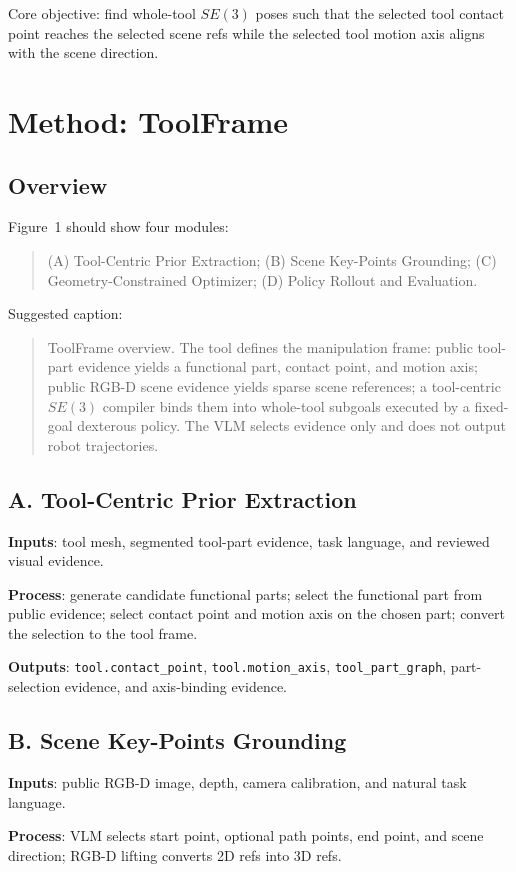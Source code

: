 \documentclass[journal]{IEEEtran}
\newcommand{\method}{ToolFrame}
\begin{document}
Core objective: find whole-tool $SE(3)$ poses such that the selected tool
contact point reaches the selected scene refs while the selected tool motion
axis aligns with the scene direction.

\section{Method: ToolFrame}
\subsection{Overview}
Figure~1 should show four modules:
\begin{quote}
(A) Tool-Centric Prior Extraction;
(B) Scene Key-Points Grounding;
(C) Geometry-Constrained Optimizer;
(D) Policy Rollout and Evaluation.
\end{quote}

Suggested caption:
\begin{quote}
\method{} overview. The tool defines the manipulation frame: public tool-part
evidence yields a functional part, contact point, and motion axis; public
RGB-D scene evidence yields sparse scene references; a tool-centric $SE(3)$
compiler binds them into whole-tool subgoals executed by a fixed-goal
dexterous policy. The VLM selects evidence only and does not output robot
trajectories.
\end{quote}

\subsection{A. Tool-Centric Prior Extraction}
\textbf{Inputs}: tool mesh, segmented tool-part evidence, task language, and
reviewed visual evidence.

\textbf{Process}: generate candidate functional parts; select the functional
part from public evidence; select contact point and motion axis on the chosen
part; convert the selection to the tool frame.

\textbf{Outputs}: \texttt{tool.contact\_point}, \texttt{tool.motion\_axis},
\texttt{tool\_part\_graph}, part-selection evidence, and axis-binding
evidence.

\subsection{B. Scene Key-Points Grounding}
\textbf{Inputs}: public RGB-D image, depth, camera calibration, and natural
task language.

\textbf{Process}: VLM selects start point, optional path points, end point, and
scene direction; RGB-D lifting converts 2D refs into 3D refs.
\end{document}
